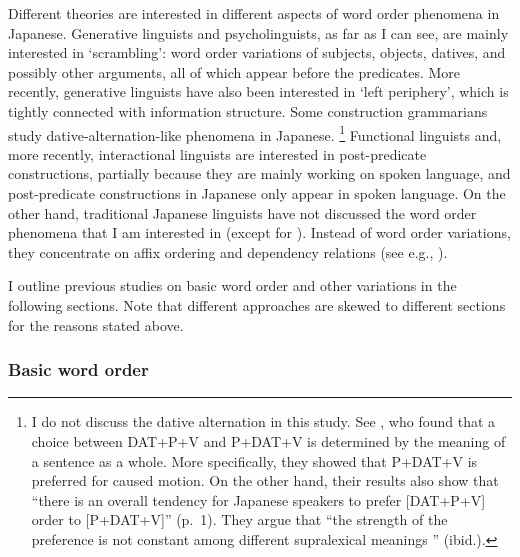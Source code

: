 Different theories are interested in different aspects of word order phenomena in Japanese.
Generative linguists and psycholinguists, as far as I can see, are mainly interested in `scrambling':
word order variations of subjects, objects, datives, and possibly other arguments,
all of which appear before the predicates.
More recently, generative linguists have also been interested in `left periphery',
which is tightly connected with information structure.
Some construction grammarians study dative-alternation-like phenomena in Japanese.%
 \footnote{
 I do not discuss the dative alternation in this study.
 See ,
 who found that a choice between DAT+P+V and P+DAT+V is determined
 by the meaning of a sentence as a whole.
 More specifically, they showed that P+DAT+V is preferred for caused motion.
 On the other hand, their results also show that
 ``there is an overall tendency for Japanese speakers to prefer [DAT+P+V] order to [P+DAT+V]'' (p.~1).
 They argue that ``the strength of the preference is not constant among different supralexical meanings '' (ibid.).
 }
Functional linguists and, more recently, interactional linguists are interested in post-predicate constructions,
partially because they are mainly working on spoken language,
and post-predicate constructions in Japanese only appear in spoken language.
On the other hand,
traditional Japanese linguists have not discussed the word order phenomena
that I am interested in (except for ).
Instead of word order variations, they concentrate on affix ordering and dependency relations (see e.g., ).

I outline previous studies on basic word order and other variations in the following sections.
Note that different approaches are skewed to different sections
for the reasons stated above.



\subsubsection{Basic word order}

